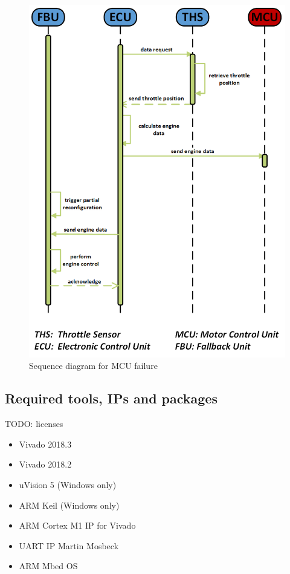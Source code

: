 \begin{figure}[h!]
    \centering
    \includegraphics[width=\textwidth]{figures/sequence_mcu_fail.png}
    \caption{Sequence diagram for MCU failure}\label{fig:sequenceMCUFailure}
\end{figure}

\subsection{Required tools, \glspl{IP} and packages}
TODO: licenses
\begin{itemize}
    \item Vivado 2018.3
    \item Vivado 2018.2
    \item uVision 5 (Windows only)
    \item ARM Keil (Windows only)
    \item ARM Cortex M1 IP for Vivado
    \item UART IP Martin Mosbeck
    \item ARM Mbed OS
\end{itemize}
